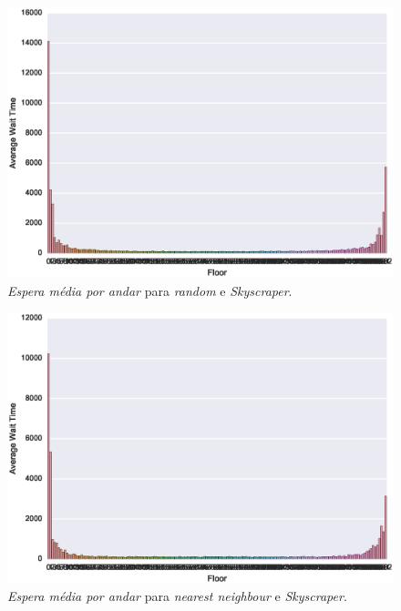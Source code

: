 \begin{figure}[H]
  \centering
  \includegraphics[scale=0.8]{img/results/Skyscraper/1_Simple_Random/averageWaitTime}
  \caption{\textit{Espera média por andar} para \textit{random} e \textit{Skyscraper}.}
  \label{fig:result:skyscraper:avgwt:random}
\end{figure}

\begin{figure}[H]
  \centering
  \includegraphics[scale=0.8]{img/results/Skyscraper/2_Simple_NearestNeighbour/averageWaitTime}
  \caption{\textit{Espera média por andar} para \textit{nearest neighbour} e \textit{Skyscraper}.}
  \label{fig:result:skyscraper:avgwt:nn}
\end{figure}

